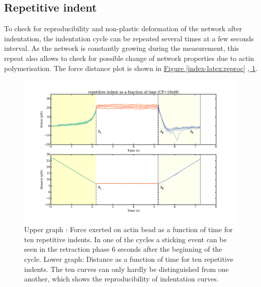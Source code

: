 \documentclass[A4paperpaper,11pt,english]{sphinxmanual}
\begin{document}
\subsection{Repetitive indent}
\label{index-latex:repetitive-indent}
To check for reproducibility and non-plastic deformation of the network after
indentation, the indentation cycle can be repeated several times at a few seconds
interval. As the network is constantly growing during the measurement, this
repeat also allows to check for possible change of network properties due to actin
polymerisation. The force distance plot is shown in \hyperref[index-latex:reproc]{Figure  \ref*{index-latex:reproc}} \hyperref[index-latex:reproc-time]{,  \ref*{index-latex:reproc-time}}.
\begin{figure}[htbp]
\centering
\capstart

\includegraphics[width=1.000\linewidth]{reproc-time.png}
\caption{Upper graph : Force exerted on actin bead as a function of time for ten
repetitive indents. In one of the cycles a sticking event can be seen in the
retraction phase 6 seconds after the beginning of the cycle. Lower graph:
Distance as a function of time for  ten repetitive indents. The ten curves
can only hardly be distinguished from one another, which shows the
reproducibility of indentation curves.}\label{index-latex:reproc-time}\end{figure}
\end{document}
